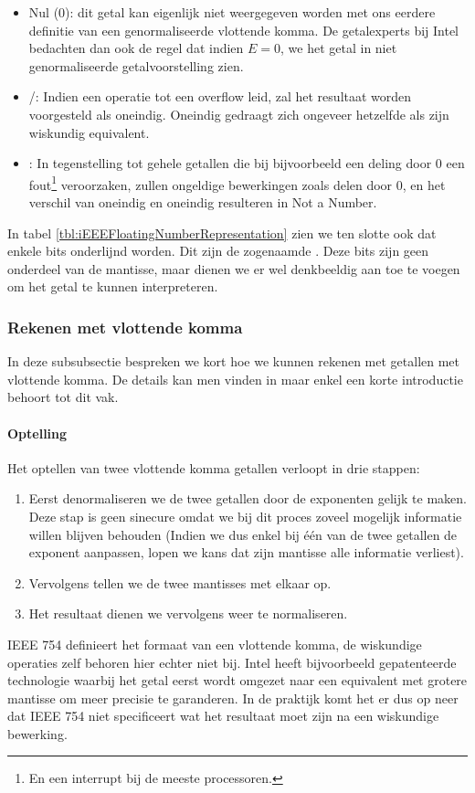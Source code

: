 \begin{itemize}
 \item Nul (0): dit getal kan eigenlijk niet weergegeven worden met ons eerdere definitie van een genormaliseerde vlottende komma. De getalexperts bij Intel bedachten dan ook de regel dat indien $E=0$, we het getal in niet genormaliseerde getalvoorstelling zien.
 \item {}/: Indien een operatie tot een overflow leid, zal het resultaat worden voorgesteld als oneindig. Oneindig gedraagt zich ongeveer hetzelfde als zijn wiskundig equivalent.
 \item {}: In tegenstelling tot gehele getallen die bij bijvoorbeeld een deling door 0 een fout\footnote{En een interrupt bij de meeste processoren.} veroorzaken, zullen ongeldige bewerkingen zoals delen door 0, en het verschil van oneindig en oneindig resulteren in Not a Number.
\end{itemize}
In tabel \ref{tbl:iEEEFloatingNumberRepresentation} zien we ten slotte ook dat enkele bits onderlijnd worden. Dit zijn de zogenaamde . Deze bits zijn geen onderdeel van de mantisse, maar dienen we er wel denkbeeldig aan toe te voegen om het getal te kunnen interpreteren.
\subsubsection{Rekenen met vlottende komma}
In deze subsubsectie bespreken we kort hoe we kunnen rekenen met getallen met vlottende komma. De details kan men vinden in \cite[\S4]{hyde2004write} maar enkel een korte introductie behoort tot dit vak.
\paragraph{Optelling}
Het optellen van twee vlottende komma getallen verloopt in drie stappen:
\begin{enumerate}
 \item Eerst denormaliseren we de twee getallen door de exponenten gelijk te maken. Deze stap is geen sinecure omdat we bij dit proces zoveel mogelijk informatie willen blijven behouden (Indien we dus enkel bij \'e\'en van de twee getallen de exponent aanpassen, lopen we kans dat zijn mantisse alle informatie verliest).
 \item Vervolgens tellen we de twee mantisses met elkaar op.
 \item Het resultaat dienen we vervolgens weer te normaliseren.
\end{enumerate}
IEEE 754 definieert het formaat van een vlottende komma, de wiskundige operaties zelf behoren hier echter niet bij. Intel heeft bijvoorbeeld gepatenteerde technologie waarbij het getal eerst wordt omgezet naar een equivalent met grotere mantisse om meer precisie te garanderen. In de praktijk komt het er dus op neer dat IEEE 754 niet specificeert wat het resultaat moet zijn na een wiskundige bewerking.
